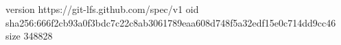 version https://git-lfs.github.com/spec/v1
oid sha256:666f2cb93a0f3bdc7c22c8ab3061789eaa608d748f5a32edf15e0c714dd9cc46
size 348828
